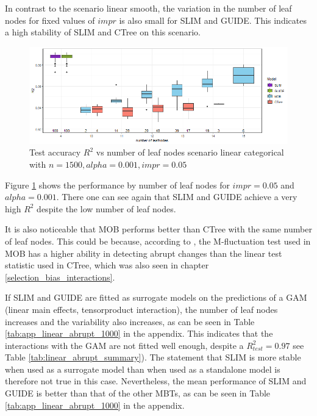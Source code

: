 In contrast to the scenario linear smooth, the variation in the number of leaf nodes for fixed values of $impr$ is also small for SLIM and GUIDE. This indicates a high stability of SLIM and CTree on this scenario. 



\begin{figure}[!htb]
\centering
    \includegraphics[width=14cm]{Figures/simulations/chapter_5_simulation_study/basic_scenarios/linear_abrupt/la_1000_standalone_r2_test.png}
    \caption{Test accuracy $R^2$ vs number of leaf nodes scenario     linear categorical with $n=1500, alpha = 0.001, impr = 0.05$}
    \label{fig:la_1000_standalone_r2_test}

\end{figure} 

Figure \ref{fig:la_1000_standalone_r2_test} shows the performance by number of leaf nodes for $impr = 0.05$ and $alpha = 0.001$. There one can see again that SLIM and GUIDE achieve a very high $R^2$ despite the low number of leaf nodes. 

It is also noticeable that MOB performs better than CTree with the same number of leaf nodes.
This could be because, according to \citep{Schlosser.2019}, the M-fluctuation test used in MOB has a higher ability in detecting abrupt changes than the linear test statistic used in CTree, which was also seen in chapter \ref{selection_bias_interactions}.



If SLIM and GUIDE are fitted as surrogate models on the predictions of a GAM (linear main effects, tensorproduct interaction), the number of leaf nodes increases and the variability also increases, as can be seen in Table \ref{tab:app_linear_abrupt_1000} in the appendix. This indicates that the interactions with the GAM are not fitted well enough, despite a  $R^2_{test} = 0.97$ see Table \ref{tab:linear_abrupt_summary}). The statement that SLIM is more stable when used as a surrogate model than when used as a standalone model \citep{Hu.2020} is therefore not true in this case.
Nevertheless, the mean performance of SLIM and GUIDE is better than that of the other MBTs, as can be seen in Table \ref{tab:app_linear_abrupt_1000} in the appendix.




